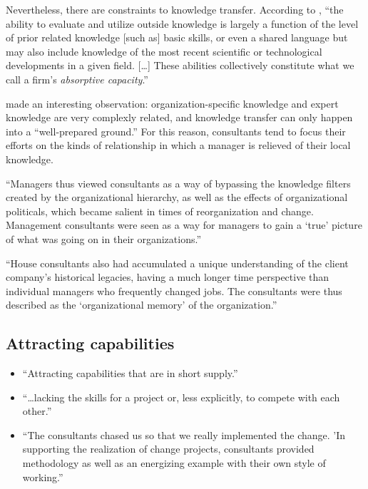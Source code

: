\documentclass[12pt]{article}
\providecommand{\tightlist}{%
  \setlength{\itemsep}{0pt}\setlength{\parskip}{0pt}}
\begin{document}
Nevertheless, there are constraints to knowledge transfer. According to
\citet[128-129]{cohen1990}, ``the ability to evaluate and utilize
outside knowledge is largely a function of the level of prior related
knowledge {[}such as{]} basic skills, or even a shared language but may
also include knowledge of the most recent scientific or technological
developments in a given field. {[}\ldots{]} These abilities collectively
constitute what we call a firm's \emph{absorptive capacity}.''

\citet[84]{fincham2002} made an interesting observation:
organization-specific knowledge and expert knowledge are very complexly
related, and knowledge transfer can only happen into a ``well-prepared
ground.'' For this reason, consultants tend to focus their efforts on
the kinds of relationship in which a manager is relieved of their local
knowledge.

``Managers thus viewed consultants as a way of bypassing the knowledge
filters created by the organizational hierarchy, as well as the effects
of organizational politicals, which became salient in times of
reorganization and change. Management consultants were seen as a way for
managers to gain a `true' picture of what was going on in their
organizations.'' \citep[ 54]{werr2002}

``House consultants also had accumulated a unique understanding of the
client company's historical legacies, having a much longer time
perspective than individual managers who frequently changed jobs. The
consultants were thus described as the `organizational memory' of the
organization.''

\hypertarget{attracting-capabilities}{%
\subsection{Attracting capabilities}\label{attracting-capabilities}}

\begin{itemize}
\tightlist
\item
  ``Attracting capabilities that are in short supply.''
  \citet[52]{aubert1996}
\item
  ``\ldots lacking the skills for a project or, less explicitly, to
  compete with each other.'' \citep[ 233]{sturdy1998}
\item
  ``The consultants chased us so that we really implemented the change.
  'In supporting the realization of change projects, consultants
  provided methodology as well as an energizing example with their own
  style of working.'' \citep[ 54]{werr2002}
\end{itemize}
\end{document}
